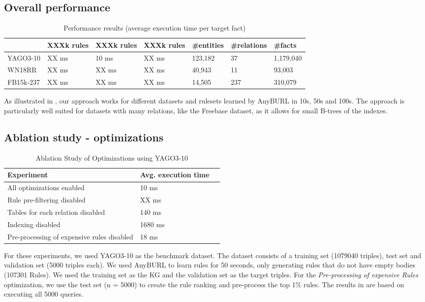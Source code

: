 \documentclass[english]{lni}
\begin{document}
\subsection{Overall performance}

\begin{table}[t]
\centering
\begin{tabular}{lllllll}
\toprule
 & XXXk rules & XXXk rules  & XXXk rules & \#entities & \#relations & \#facts\\
\midrule
YAGO3-10 & XX ms & 10 ms & XX ms & 123,182 & 37 & 1,179,040\\
WN18RR & XX ms & XX ms & XX ms & 40,943 & 11 & 93,003\\
FB15k-237 & XX ms & XX ms & XX ms & 14,505 & 237 & 310,079\\
\bottomrule
\end{tabular}
\caption{Performance results (average execution time per target fact)}
\label{tab:overall}
\end{table}

As illustrated in , our approach works for different datasets and rulesets learned by AnyBURL in 10s, 50s and 100s. The approach is particularly well suited for datasets with many relations, like the Freebase dataset, as it allows for small B-trees of the indexes.

\subsection{Ablation study - optimizations} 

\begin{table}[t]
\centering
\begin{tabular}{lll}
\toprule
Experiment & Avg. execution time \\
\midrule
All optimizations enabled & 10 ms\\
\midrule
Rule pre-filtering disabled & XX ms\\
Tables for each relation disabled & 140 ms\\
Indexing disabled & 1680 ms\\
Pre-processing of expensive rules disabled & 18 ms\\

\bottomrule
\end{tabular}
\caption{Ablation Study of Optimizations using YAGO3-10}
\label{tab:ablation}
\end{table}

For these experiments, we used YAGO3-10 as the benchmark dataset.\cite{YAGO3} The dataset consists of a training set (1079040 triples), test set and validation set (5000 triples each). We used AnyBURL to learn rules for 50 seconds, only generating rules that do not have empty bodies (107301 Rules). We used the training set as the KG and the validation set as the target triples. For the \textit{Pre-processing of expensive Rules} optimization, we use the test set (n = 5000) to create the rule ranking and pre-process the top 1\% rules. The results in  are based on executing all 5000 queries.
\end{document}
